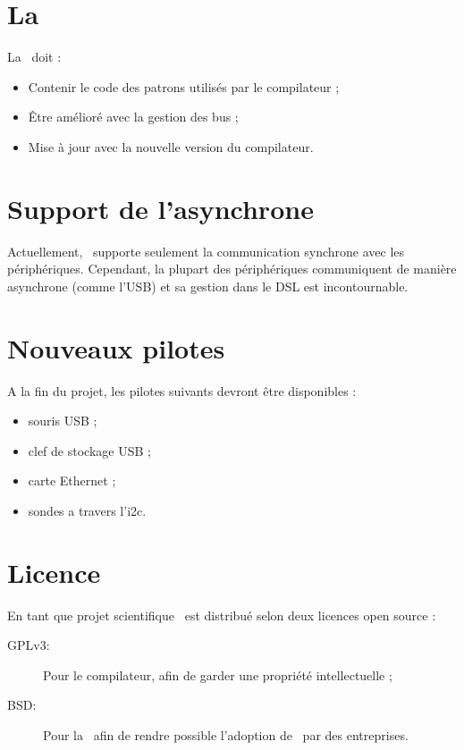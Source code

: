 \documentclass[chapterprefix=off]{rtxreport}
\begin{document}
\section{La \BL}

La \BL\ doit :
\begin{itemize}
\item Contenir le code des patrons utilisés par le compilateur ;
\item Être amélioré avec la gestion des bus ;
\item Mise \`a jour avec la nouvelle version du compilateur.
\end{itemize}

\section{Support de l'asynchrone}

Actuellement, \rtx\ supporte seulement la communication synchrone avec les
périphériques. Cependant, la plupart des périphériques communiquent de manière
asynchrone (comme l'USB) et sa gestion dans le DSL est incontournable.

\section{Nouveaux pilotes}

A la fin du projet, les pilotes suivants devront être disponibles :
\begin{itemize}
\item souris USB ;
\item clef de stockage USB ;
\item carte Ethernet ;
\item sondes a travers l'i2c.
\end{itemize}

\section{Licence}

En tant que projet scientifique \rtx\ est distribué selon deux licences open
source :
\begin{description}
\item[GPLv3:] Pour le compilateur, afin de garder une propriété intellectuelle ;
\item[BSD:] Pour la \BL\ afin de rendre possible l'adoption de \rtx\ par des
entreprises.
\end{description}
\end{document}
